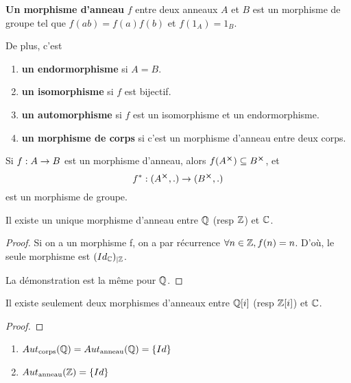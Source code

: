 \begin{definition}
	\textbf{Un morphisme d'anneau} $f$ entre deux anneaux $A$ et $B$ est un
	morphisme de groupe tel que $f(ab) = f(a) f(b)$ et $f(1_{A}) = 1_{B}$.

	De plus, c'est
	\begin{enumerate}
		\item \textbf{un endormorphisme} si $A = B$.
		\item \textbf{un isomorphisme} si $f$ est bijectif.
		\item \textbf{un automorphisme} si $f$ est un isomorphisme et un
			endormorphisme.
		\item \textbf{un morphisme de corps} si c'est un morphisme d'anneau entre deux corps.
	\end{enumerate}
\end{definition}

\begin{remarque}
	Si $f : A \rightarrow B$ est un morphisme d'anneau, alors $f(A^{\cross})
	\subseteq B^{\cross}$, et
	\begin{equation}
		f^{*} : (A^{\cross}, .) \rightarrow (B^{\cross}, .)
	\end{equation}
	est un morphisme de groupe.
\end{remarque}

\begin{proposition}
	Il existe un unique morphisme d'anneau entre $\mathbb{Q}$ (resp $\mathbb{Z}$)
	et $\mathbb{C}$.
\end{proposition}

\ifdefined\outputproof
\begin{proof}
	Si on a un morphisme f, on a par récurrence $\forall n \in \mathbb{Z}, f(n) =
	n$. D'où, le seule morphisme est $({Id_{\mathbb{C}}})_{|\mathbb{Z}}$.

	La démonstration est la même pour $\mathbb{Q}$.
\end{proof}
\fi

\begin{proposition}
	Il existe seulement deux morphismes d'anneaux entre $\mathbb{Q}[i]$ (resp
	$\mathbb{Z}[i]$) et $\mathbb{C}$.
\end{proposition}

\ifdefined\outputproof
\begin{proof}

\end{proof}
\fi

\begin{corollary}
	\begin{enumerate}
		\item $Aut_{\text{corps}}(\mathbb{Q}) =
			Aut_{\text{anneau}}(\mathbb{Q}) = \left\{ Id \right\}$
		\item $Aut_{\text{anneau}}(\mathbb{Z}) = \left\{ Id \right\}$
	\end{enumerate}
\end{corollary}

